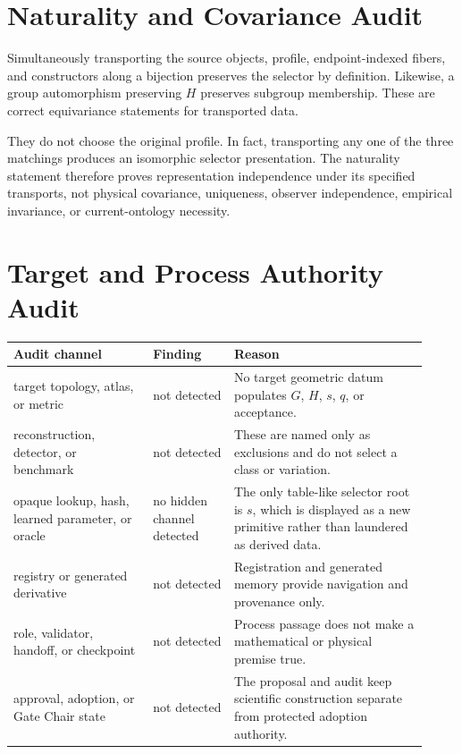 \documentclass[11pt]{article}
\begin{document}
\section{Naturality and Covariance Audit}

Simultaneously transporting the source objects, profile, endpoint-indexed
fibers, and constructors along a bijection preserves the selector by
definition.  Likewise, a group automorphism preserving \(H\) preserves
subgroup membership.  These are correct equivariance statements for
transported data.

They do not choose the original profile.  In fact, transporting any one of
the three matchings produces an isomorphic selector presentation.  The
naturality statement therefore proves representation independence under its
specified transports, not physical covariance, uniqueness, observer
independence, empirical invariance, or current-ontology necessity.

\section{Target and Process Authority Audit}

\begin{longtable}{p{0.31\linewidth}p{0.18\linewidth}p{0.43\linewidth}}
\toprule
Audit channel & Finding & Reason\\
\midrule
target topology, atlas, or metric & not detected & No target geometric datum populates \(G\), \(H\), \(s\), \(q\), or acceptance.\\
reconstruction, detector, or benchmark & not detected & These are named only as exclusions and do not select a class or variation.\\
opaque lookup, hash, learned parameter, or oracle & no hidden channel detected & The only table-like selector root is \(s\), which is displayed as a new primitive rather than laundered as derived data.\\
registry or generated derivative & not detected & Registration and generated memory provide navigation and provenance only.\\
role, validator, handoff, or checkpoint & not detected & Process passage does not make a mathematical or physical premise true.\\
approval, adoption, or Gate Chair state & not detected & The proposal and audit keep scientific construction separate from protected adoption authority.\\
\bottomrule
\end{longtable}
\end{document}
